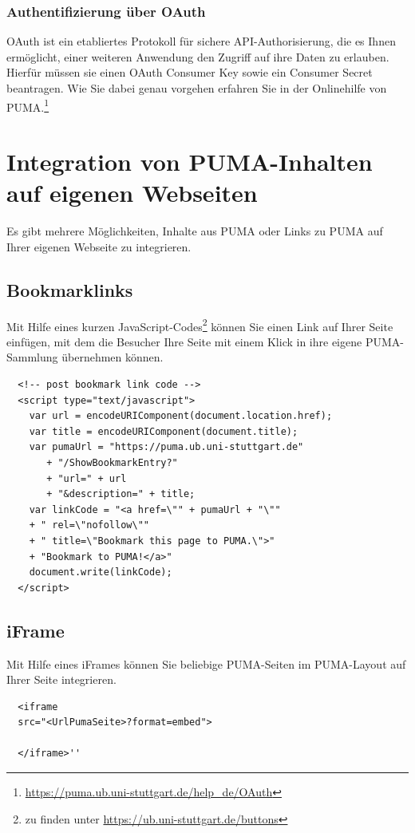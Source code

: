 \subsubsection*{Authentifizierung über OAuth}
\label{sss:oAuth}
OAuth ist ein etabliertes Protokoll für sichere API-Authorisierung, die es Ihnen ermöglicht, einer weiteren Anwendung den Zugriff auf ihre Daten zu erlauben. Hierfür müssen sie einen OAuth Consumer Key sowie ein Consumer Secret beantragen. Wie Sie dabei genau vorgehen erfahren Sie in der Onlinehilfe von PUMA.\footnote{\url{https://puma.ub.uni-stuttgart.de/help_de/OAuth}}



\section{Integration von PUMA-Inhalten auf eigenen Webseiten}
\label{sec:eigeneWebseiten}
Es gibt mehrere Möglichkeiten, Inhalte aus PUMA oder Links zu PUMA auf Ihrer eigenen Webseite zu integrieren.

\subsection{Bookmarklinks}
\label{subsec:bookmarklinks}
Mit Hilfe eines kurzen JavaScript-Codes\footnote{zu finden unter \url{https://ub.uni-stuttgart.de/buttons}} können Sie einen Link auf Ihrer Seite einfügen, mit dem die Besucher Ihre Seite mit einem Klick in ihre eigene PUMA-Sammlung übernehmen können.
\lstset{language=JBScript}
\begin{lstlisting}
  <!-- post bookmark link code -->
  <script type="text/javascript">
    var url = encodeURIComponent(document.location.href);
    var title = encodeURIComponent(document.title);
    var pumaUrl = "https://puma.ub.uni-stuttgart.de"
       + "/ShowBookmarkEntry?"
       + "url=" + url
       + "&description=" + title;
    var linkCode = "<a href=\"" + pumaUrl + "\""
    + " rel=\"nofollow\""
    + " title=\"Bookmark this page to PUMA.\">"
    + "Bookmark to PUMA!</a>"
    document.write(linkCode);
  </script>
\end{lstlisting}

\subsection{iFrame}
\label{subsec:iFrame}
Mit Hilfe eines iFrames können Sie beliebige PUMA-Seiten im PUMA-Layout auf Ihrer Seite integrieren. 
\lstset{language=HTML}
\begin{lstlisting}
  <iframe
  src="<UrlPumaSeite>?format=embed">

  </iframe>''
\end{lstlisting}

